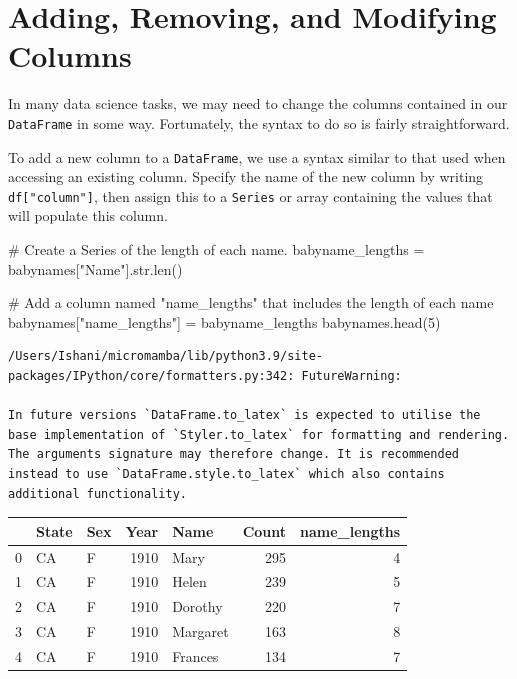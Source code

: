 \documentclass[
  letterpaper,
  DIV=11,
  numbers=noendperiod]{scrreprt}
\newenvironment{Shaded}{\begin{snugshade}}{\end{snugshade}}
\newcommand{\BuiltInTok}[1]{\textcolor[rgb]{0.00,0.23,0.31}{#1}}
\newcommand{\CommentTok}[1]{\textcolor[rgb]{0.37,0.37,0.37}{#1}}
\newcommand{\DecValTok}[1]{\textcolor[rgb]{0.68,0.00,0.00}{#1}}
\newcommand{\NormalTok}[1]{\textcolor[rgb]{0.00,0.23,0.31}{#1}}
\newcommand{\OperatorTok}[1]{\textcolor[rgb]{0.37,0.37,0.37}{#1}}
\newcommand{\StringTok}[1]{\textcolor[rgb]{0.13,0.47,0.30}{#1}}
\begin{document}
\hypertarget{adding-removing-and-modifying-columns}{%
\section{Adding, Removing, and Modifying
Columns}\label{adding-removing-and-modifying-columns}}

In many data science tasks, we may need to change the columns contained
in our \texttt{DataFrame} in some way. Fortunately, the syntax to do so
is fairly straightforward.

To add a new column to a \texttt{DataFrame}, we use a syntax similar to
that used when accessing an existing column. Specify the name of the new
column by writing \texttt{df{[}"column"{]}}, then assign this to a
\texttt{Series} or array containing the values that will populate this
column.

\begin{Shaded}
\begin{Highlighting}[]
\CommentTok{\# Create a Series of the length of each name. }
\NormalTok{babyname\_lengths }\OperatorTok{=}\NormalTok{ babynames[}\StringTok{"Name"}\NormalTok{].}\BuiltInTok{str}\NormalTok{.}\BuiltInTok{len}\NormalTok{()}

\CommentTok{\# Add a column named "name\_lengths" that includes the length of each name}
\NormalTok{babynames[}\StringTok{"name\_lengths"}\NormalTok{] }\OperatorTok{=}\NormalTok{ babyname\_lengths}
\NormalTok{babynames.head(}\DecValTok{5}\NormalTok{)}
\end{Highlighting}
\end{Shaded}

\begin{verbatim}
/Users/Ishani/micromamba/lib/python3.9/site-packages/IPython/core/formatters.py:342: FutureWarning:

In future versions `DataFrame.to_latex` is expected to utilise the base implementation of `Styler.to_latex` for formatting and rendering. The arguments signature may therefore change. It is recommended instead to use `DataFrame.style.to_latex` which also contains additional functionality.
\end{verbatim}

\begin{tabular}{lllrlrr}
\toprule
{} & State & Sex &  Year &      Name &  Count &  name\_lengths \\
\midrule
0 &    CA &   F &  1910 &      Mary &    295 &             4 \\
1 &    CA &   F &  1910 &     Helen &    239 &             5 \\
2 &    CA &   F &  1910 &   Dorothy &    220 &             7 \\
3 &    CA &   F &  1910 &  Margaret &    163 &             8 \\
4 &    CA &   F &  1910 &   Frances &    134 &             7 \\
\bottomrule
\end{tabular}
\end{document}
